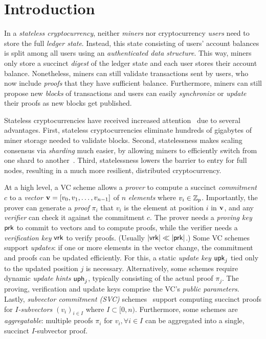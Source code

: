 %
\section{Introduction}

In a \textit{stateless cryptocurrency}, neither \textit{miners} nor cryptocurrency \textit{users} need to store the full \textit{ledger state}.
Instead, this state consisting of users' account balances is split among all users using an \textit{authenticated data structure}.
This way, miners only store a succinct \textit{digest} of the ledger state and each user stores their account balance.
Nonetheless, miners can still validate transactions sent by users, who now include \textit{proofs} that they have sufficient balance.
Furthermore, miners can still propose new \textit{blocks} of transactions and users can easily \textit{synchronize} or \textit{update} their proofs as new blocks get published.

Stateless cryptocurrencies have received increased attention~ due to several advantages.
First, stateless cryptocurrencies eliminate hundreds of gigabytes of miner storage needed to validate blocks.
Second, statelessness makes scaling consensus via \textit{sharding} much easier, by allowing miners to efficiently switch from one shard to another~.
Third, statelessness lowers the barrier to entry for full nodes, resulting in a much more resilient, distributed cryptocurrency.

At a high level, a VC scheme allows a \textit{prover}  to compute a succinct \textit{commitment} $c$ to a \textit{vector} $\bm{\mathrm{v}}=[v_0, v_1, \dots, v_{n-1}]$ of  $n$ \textit{elements} where $v_i\in \mathbb{Z}_p$.
Importantly, the prover can generate a \textit{proof} $\pi_i$ that $v_i$ is the element at position $i$ in $\bm{\mathrm{v}}$, and any \textit{verifier} can check it against the commitment $c$.
The prover needs a \textit{proving key} $\mathsf{prk}$ to commit to vectors and to compute proofs, while the verifier needs a \textit{verification key} $\mathsf{vrk}$ to verify proofs.
(Usually $|\mathsf{vrk}| \ll |\mathsf{prk}|$.)
Some VC schemes support \textit{updates}: if one or more elements in the vector change, the commitment and proofs can be updated efficiently.
For this, a static \textit{update key} $\mathsf{upk}_j$ tied only to the updated position $j$ is necessary.
Alternatively, some schemes require dynamic \textit{update hints} $\mathsf{uph}_j$, typically consisting of the actual proof $\pi_j$.
The proving, verification and update keys comprise the VC's \textit{public parameters}.
Lastly, \textit{subvector commitment (SVC)} schemes~\cite{LM19} support computing succinct proofs for \textit{$I$-subvectors} $(v_i)_{i\in I}$ where $I\subset [0,n)$.
Furthermore, some schemes are \textit{aggregatable}: multiple proofs $\pi_i$ for $v_i, \forall i \in I$ can be aggregated into a single, succinct $I$-subvector proof.

